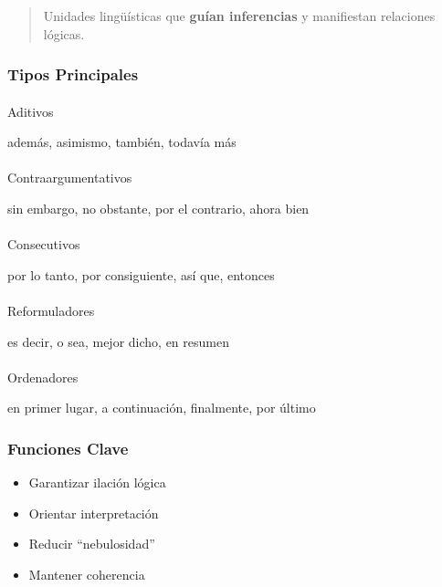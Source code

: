 \documentclass[
  11pt,
]{beaner}
\makeatletter
\let\oldparagraph\paragraph
\renewcommand{\paragraph}{
    \@ifstar
      \xxxParagraphStar
      \xxxParagraphNoStar
  }
\newcommand{\xxxParagraphStar}[1]{\oldparagraph*{#1}\mbox{}}
\newcommand{\xxxParagraphNoStar}[1]{\oldparagraph{#1}\mbox{}}
\providecommand{\tightlist}{%
  \setlength{\itemsep}{0pt}\setlength{\parskip}{0pt}}
\makeatother
\begin{document}
\begin{quote}
Unidades lingüísticas que \textbf{guían inferencias} y manifiestan
relaciones lógicas.
\end{quote}

\subsubsection{Tipos Principales}\label{tipos-principales}

\paragraph{Aditivos}\label{aditivos}

además, asimismo, también, todavía más

\paragraph{Contraargumentativos}\label{contraargumentativos}

sin embargo, no obstante, por el contrario, ahora bien

\paragraph{Consecutivos}\label{consecutivos}

por lo tanto, por consiguiente, así que, entonces

\paragraph{Reformuladores}\label{reformuladores}

es decir, o sea, mejor dicho, en resumen

\paragraph{Ordenadores}\label{ordenadores}

en primer lugar, a continuación, finalmente, por último

\subsubsection{Funciones Clave}\label{funciones-clave}

\begin{itemize}
\tightlist
\item
  Garantizar ilación lógica\\
\item
  Orientar interpretación\\
\item
  Reducir ``nebulosidad''\\
\item
  Mantener coherencia
\end{itemize}
\end{document}
